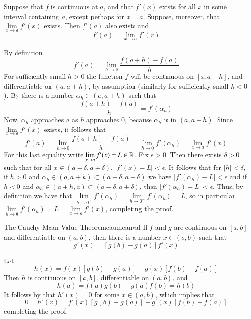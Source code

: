 \documentclass[12pt]{report}
\begin{document}
\begin{thm}{}{}
    Suppose that $f$ is continuous at $a$, and that $f'(x)$ exists for all $x$ in some interval containing $a$, except perhaps for $x = a$. Suppose, moreover, that $\lim\limits_{x\rightarrow a}f'(x)$ exists. Then $f'(a)$ also exists and \begin{equation}
        f'(a) = \lim\limits_{x\rightarrow a}f'(x)
    \end{equation}
\end{thm}
\begin{proof*}{}{}
    By definition \begin{equation*}
        f'(a) = \lim\limits_{h\rightarrow 0}\frac{f(a+h) - f(a)}{h}
    \end{equation*}
    For sufficiently small $h > 0$ the function $f$ will be continuous on $[a,a+h]$, and differentiable on $(a,a+h)$, by assumption (similarly for sufficiently small $h < 0$). By  there is a number $\alpha_h \in (a,a+h)$ such that $$\frac{f(a+h) - f(a)}{h} = f'(\alpha_h)$$
    Now, $\alpha_h$ approaches $a$ as $h$ approaches $0$, because $\alpha_h$ is in $(a,a+h)$. Since $\lim\limits_{x\rightarrow a}f'(x)$ exists, it follows that $$f'(a) = \lim\limits_{h\rightarrow 0}\frac{f(a+h) - f(a)}{h} = \lim\limits_{h\rightarrow 0}f'(\alpha_h) = \lim\limits_{x\rightarrow a}f'(x)$$
    For this last equality write $\lim\limits_{x\rightarrow a}f'(x) = L \in \mathbb R$. Fix $\epsilon > 0$. Then there exists $\delta > 0$ such that for all $x \in (a-\delta, a+\delta)$, $|f'(x) - L| < \epsilon$. It follows that for $|h| < \delta$, if $h > 0$ and $\alpha_h \in (a,a+h) \subset (a-\delta,a+\delta)$ we have $|f'(\alpha_h) - L| < \epsilon$ and if $h < 0$ and $\alpha_h \in (a+h, a) \subset (a-\delta,a+\delta)$, then $|f'(\alpha_h) - L| < \epsilon$. Thus, by definition we have that $\lim\limits_{h\rightarrow 0^+}f'(\alpha_h) = \lim\limits_{h\rightarrow 0^-}f'(\alpha_h) = L$, so in particular $\lim\limits_{h\rightarrow 0}f'(\alpha_h) = L = \lim\limits_{x\rightarrow a}f'(x)$, completing the proof.
\end{proof*}


\begin{namthm}{The Cauchy Mean Value Theorem}{caumeanval}
    If $f$ and $g$ are continuous on $[a,b]$ and differentiable on $(a,b)$, then there is a number $x \in (a,b)$ such that \begin{equation}
        [f(b) - f(a)]g'(x) = [g(b) - g(a)]f'(x)
    \end{equation}
\end{namthm}
\begin{proof*}{}{}
    Let $$h(x) = f(x)[g(b) - g(a)] - g(x)[f(b)-f(a)]$$
    Then $h$ is continuous on $[a,b]$, differentiable on $(a,b)$, and $$h(a) = f(a)g(b) - g(a)f(b) = h(b)$$
    It follows by  that $h'(x) = 0$ for some $x \in (a,b)$, which implies that \begin{equation*}
        0 = h'(x) = f'(x)[g(b)-g(a)] - g'(x)[f(b) - f(a)]
    \end{equation*}
    completing the proof.
\end{proof*}
\end{document}
